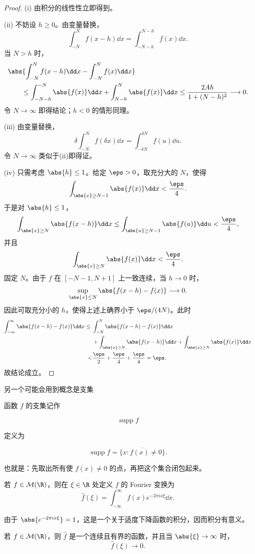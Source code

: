 \begin{proof}
	(i) 由积分的线性性立即得到。
	
	(ii) 不妨设 $h\geq0$。由变量替换，
	\[
	\int_{-N}^{N}f(x-h)\dd x
	=\int_{-N-h}^{N-h}f(x)\dd x.
	\]
	当 $N>h$ 时，
	\[
	\begin{aligned}
		&\abs{\int_{-N}^{N}f(x-h)\dd x-\int_{-N}^{N}f(x)\dd x}\\
		&\qquad\leq
		\int_{-N-h}^{-N}\abs{f(x)}\dd x
		+\int_{N-h}^{N}\abs{f(x)}\dd x
		\leq \frac{2Ah}{1+(N-h)^2}\longrightarrow0.
	\end{aligned}
	\]
	令 $N\to\infty$ 即得结论；$h<0$ 的情形同理。
	
	(iii) 由变量替换，
	\[
	\delta\int_{-N}^{N}f(\delta x)\dd x
	=\int_{-\delta N}^{\delta N}f(u)\dd u.
	\]
	令 $N\to\infty$ 类似于(ii)即得证。
	
	(iv) 只需考虑 $\abs{h}\leq1$。给定 $\eps>0$，取充分大的 $N$，使得
	\[
	\int_{\abs{x}\geq N-1}\abs{f(x)}\dd x<\frac{\eps}{4}.
	\]
	于是对 $\abs{h}\leq1$，
	\[
	\int_{\abs{x}\geq N}\abs{f(x-h)}\dd x
	\leq\int_{\abs{u}\geq N-1}\abs{f(u)}\dd u
	<\frac{\eps}{4},
	\]
	并且
	\[
	\int_{\abs{x}\geq N}\abs{f(x)}\dd x<\frac{\eps}{4}.
	\]
	固定 $N$。由于 $f$ 在 $[-N-1,N+1]$ 上一致连续，当 $h\to0$ 时，
	\[
	\sup_{\abs{x}\leq N}\abs{f(x-h)-f(x)}\longrightarrow0.
	\]
	因此可取充分小的 $h$，使得上述上确界小于 $\eps/(4N)$。此时
	\[
	\begin{aligned}
		\int_{-\infty}^{\infty}\abs{f(x-h)-f(x)}\dd x
		\leq{}&\int_{-N}^{N}\abs{f(x-h)-f(x)}\dd x\\
		&+\int_{\abs{x}\geq N}\abs{f(x-h)}\dd x
		+\int_{\abs{x}\geq N}\abs{f(x)}\dd x\\
		<&\frac{\eps}{2}+\frac{\eps}{4}+\frac{\eps}{4}=\eps.
	\end{aligned}
	\]
	故结论成立。
\end{proof}
另一个可能会用到概念是支集
\begin{definition}
	函数 $f$ 的支集记作
	
	$$
	\operatorname{supp} f
	$$
	
	定义为
	
	$$
	\operatorname{supp} f=\overline{\{x: f(x) \neq 0\}} .
	$$
	
	也就是：先取出所有使 $f(x) \neq 0$ 的点，再把这个集合闭包起来。
\end{definition}
\begin{definition}
	若 $f\in\mathcal M(\R)$，则在 $\xi\in\R$ 处定义 $f$ 的 Fourier 变换为
	\[
	\widehat f(\xi)
	=\int_{-\infty}^{\infty}f(x)e^{-2\pi i x\xi}\dd x.
	\]
	
\end{definition}
由于 $\abs{e^{-2\pi i x\xi}}=1$，这是一个关于适度下降函数的积分，因而积分有意义。
\begin{proposition}
	若 $f\in\mathcal M(\R)$，则 $\widehat f$ 是一个连续且有界的函数，并且当 $\abs{\xi}\to\infty$ 时，
	\[
	\widehat f(\xi)\longrightarrow0.
	\]
\end{proposition}

